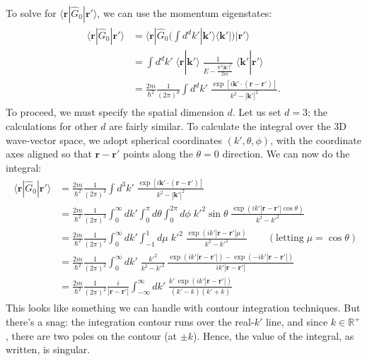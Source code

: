 \documentclass[pra,12pt]{revtex4}
\begin{document}
To solve for $\langle\mathbf{r}|\hat{G}_0|\mathbf{r}'\rangle$, we can
use the momentum eigenstates:
\begin{align}
  \begin{aligned}\langle\mathbf{r}|\hat{G}_0|\mathbf{r}'\rangle &=
    \langle\mathbf{r}|\hat{G}_0 \Big(\int d^dk' |\mathbf{k}'\rangle\langle\mathbf{k}'| \Big) |\mathbf{r}'\rangle \\ &= \int d^dk' \; \langle\mathbf{r}|\mathbf{k}'\rangle \; \frac{1}{E-\frac{\hbar^2|\mathbf{k}'|^2}{2m}} \; \langle\mathbf{k}'|\mathbf{r}'\rangle \\ &= \frac{2m}{\hbar^2} \frac{1}{(2\pi)^d} \int d^dk' \; \frac{\exp\left[i\mathbf{k}' \cdot (\mathbf{r}-\mathbf{r}')\right]}{k^2-|\mathbf{k}'|^2}.\end{aligned}
  \label{rGr}
\end{align}
To proceed, we must specify the spatial dimension $d$.  Let us set $d
= 3$; the calculations for other $d$ are fairly similar.  To calculate
the integral over the 3D wave-vector space, we adopt spherical
coordinates $(k',\theta,\phi)$, with the coordinate axes aligned so
that $\mathbf{r}-\mathbf{r}'$ points along the $\theta=0$ direction.
We can now do the integral:
\begin{align*}
  \begin{aligned}\langle\mathbf{r}|\hat{G}_0|\mathbf{r}'\rangle &= \frac{2m}{\hbar^2} \frac{1}{(2\pi)^3} \int d^3k' \; \frac{\exp\left[i\mathbf{k}'\cdot (\mathbf{r}-\mathbf{r}')\right]}{k^2-|\mathbf{k}'|^2} \\ &= \frac{2m}{\hbar^2} \frac{1}{(2\pi)^3} \int_0^\infty dk' \int_0^\pi d\theta \int_{0}^{2\pi} d\phi \;{k'}^{2}\sin\theta\; \frac{\displaystyle \exp\left(ik'|\mathbf{r}-\mathbf{r}'|\cos\theta\right)}{k^2-{k'}^2} \\ &= \frac{2m}{\hbar^2} \frac{1}{(2\pi)^2} \int_0^\infty dk' \int_{-1}^1 d\mu \;{k'}^2\; \frac{\displaystyle \exp\left(ik'|\mathbf{r}-\mathbf{r}'|\mu\right)}{k^2-{k'}^2} \qquad(\text{letting}\;\mu = \cos\theta) \\ &= \frac{2m}{\hbar^2} \frac{1}{(2\pi)^2} \int_0^\infty dk' \; \frac{ {k'}^2}{k^2-{k'}^2}\, \frac{\displaystyle \exp\left(ik'|\mathbf{r}-\mathbf{r}'|\right) - \exp\left(-ik'|\mathbf{r}-\mathbf{r}'|\right)}{ik'|\mathbf{r}-\mathbf{r}'|} \\ &= \frac{2m}{\hbar^2} \frac{1}{(2\pi)^2} \frac{i}{|\mathbf{r}-\mathbf{r}'|} \int_{-\infty}^\infty dk' \; \frac{\displaystyle k'\, \exp\left(ik'|\mathbf{r}-\mathbf{r}'|\right)}{(k' - k)(k'+k)}\end{aligned}
\end{align*}
This looks like something we can handle with contour integration
techniques.  But there's a snag: the integration contour runs over the
real-$k'$ line, and since $k \in \mathbb{R}^+$, there are two poles
on the contour (at $\pm k$).  Hence, the value of the integral, as
written, is singular.
\end{document}
